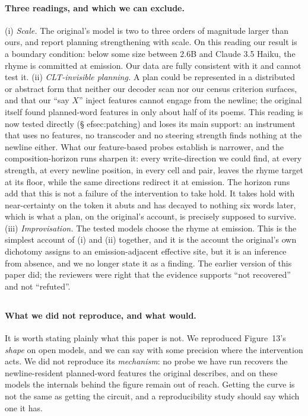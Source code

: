 \documentclass[11pt]{article}
\begin{document}
\paragraph{Three readings, and which we can exclude.}
(i) \emph{Scale.} The original's model is two to three orders of magnitude larger than ours, and \citet{hanna2026latent} report planning strengthening with scale. On this reading our result is a boundary condition: below some size between 2.6B and Claude 3.5 Haiku, the rhyme is committed at emission. Our data are fully consistent with it and cannot test it. (ii) \emph{CLT-invisible planning.} A plan could be represented in a distributed or abstract form that neither our decoder scan nor our census criterion surfaces, and that our ``say $X$'' inject features cannot engage from the newline; the original itself found planned-word features in only about half of its poems. This reading is now tested directly (\S
ef{sec:patching}) and loses its main support: an instrument that uses no features, no transcoder and no steering strength finds nothing at the newline either. What our feature-based probes establish is narrower, and the composition-horizon runs sharpen it: every write-direction we could find, at every strength, at every newline position, in every cell and pair, leaves the rhyme target at its floor, while the same directions redirect it at emission. The horizon runs add that this is not a failure of the intervention to take hold. It takes hold with near-certainty on the token it abuts and has decayed to nothing six words later, which is what a plan, on the original's account, is precisely supposed to survive. (iii) \emph{Improvisation.} The tested models choose the rhyme at emission. This is the simplest account of (i) and (ii) together, and it is the account the original's own dichotomy assigns to an emission-adjacent effective site, but it is an inference from absence, and we no longer state it as a finding. The earlier version of this paper did; the reviewers were right that the evidence supports ``not recovered'' and not ``refuted''.

\subsection*{}
\paragraph{What we did not reproduce, and what would.}
It is worth stating plainly what this paper is not. We reproduced Figure~13's \emph{shape} on open models, and we can say with some precision where the intervention acts. We did not reproduce its \emph{mechanism}: no probe we have run recovers the newline-resident planned-word features the original describes, and on these models the internals behind the figure remain out of reach. Getting the curve is not the same as getting the circuit, and a reproducibility study should say which one it has.
\end{document}
